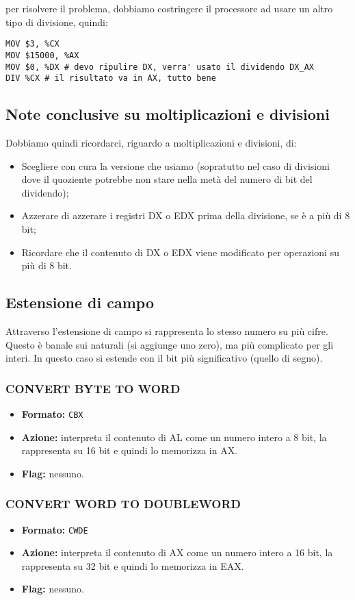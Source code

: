 \documentclass[a4paper,11pt]{article}
\begin{document}
per risolvere il problema, dobbiamo costringere il processore ad usare un altro tipo di divisione, quindi:
\begin{lstlisting}[style=codestyle]	
MOV $3, %CX
MOV $15000, %AX
MOV $0, %DX	# devo ripulire DX, verra' usato il dividendo DX_AX 
DIV %CX	# il risultato va in AX, tutto bene 
\end{lstlisting}

\subsection{Note conclusive su moltiplicazioni e divisioni}
Dobbiamo quindi ricordarci, riguardo a moltiplicazioni e divisioni, di:
\begin{itemize}
	\item Scegliere con cura la versione che usiamo (sopratutto nel caso di divisioni dove il quoziente potrebbe non stare nella metà del numero di bit del dividendo);
	\item Azzerare di azzerare i registri DX o EDX prima della divisione, se è a più di 8 bit;
	\item Ricordare che il contenuto di DX o EDX viene modificato per operazioni su più di 8 bit.
\end{itemize}

\subsection{Estensione di campo}
Attraverso l'estensione di campo si rappresenta lo stesso numero su più cifre.
Questo è banale sui naturali (si aggiunge uno zero), ma più complicato per gli interi.
In questo caso si estende con il bit più significativo (quello di segno).

\subsubsection{CONVERT BYTE TO WORD}
\begin{itemize}
	\item \textbf{Formato:} \texttt{CBX}
	\item \textbf{Azione:} interpreta il contenuto di AL come un numero intero a 8 bit, la rappresenta su 16 bit e quindi lo memorizza in AX.
	\item \textbf{Flag:} nessuno.
\end{itemize}

\subsubsection{CONVERT WORD TO DOUBLEWORD}
\begin{itemize}
	\item \textbf{Formato:} \texttt{CWDE}
	\item \textbf{Azione:} interpreta il contenuto di AX come un numero intero a 16 bit, la rappresenta su 32 bit e quindi lo memorizza in EAX.
	\item \textbf{Flag:} nessuno.
\end{itemize}
\end{document}

